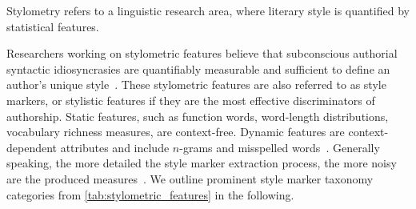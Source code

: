 
\begin{definition}
    [Stylometry]
    Stylometry refers to a linguistic research area, where literary style is quantified by statistical features.
\end{definition}
Researchers working on stylometric features believe that subconscious authorial syntactic idiosyncrasies are quantifiably measurable and sufficient to define an author's unique style~\citep{neal_surveying_2018}. 
These stylometric features are also referred to as style markers, or stylistic features if they are the most effective discriminators of authorship. 
Static features, such as function words, word-length distributions, vocabulary richness measures, are context-free.
Dynamic features are context-dependent attributes and include $n$-grams and misspelled words~\citep{abbasi_writeprints_2008}.
Generally speaking, the more detailed the style marker extraction process, the more noisy are the produced measures~\citep{stamatatos_survey_2009}.
We outline prominent style marker taxonomy categories from \autoref{tab:stylometric_features} in the following. 

